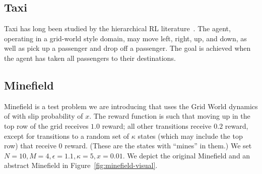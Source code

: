 \subsection{Taxi}

Taxi has long been studied by the hierarchical RL literature~\cite{dietterich2000hierarchical}. The agent, operating in a grid-world style domain, may move left, right, up, and down, as well as pick up a passenger and drop off a passenger. The goal is achieved when the agent has taken all passengers to their destinations.






\subsection{Minefield}

Minefield is a test problem we are introducing that uses the Grid World dynamics of \citeauthor{russell1995modern} with slip probability of $x$. The reward function is such that moving up in the top row of the grid receives $1.0$ reward; all other transitions receive $0.2$ reward, except for transitions to a random set of $\kappa$ states (which may include the top row) that receive $0$ reward. (These are the states with ``mines'' in them.) We set $N=10, M=4, \epsilon=1.1, \kappa = 5, x = 0.01$. We depict the original Minefield and an abstract Minefield in Figure~\ref{fig:minefield-visual}.

